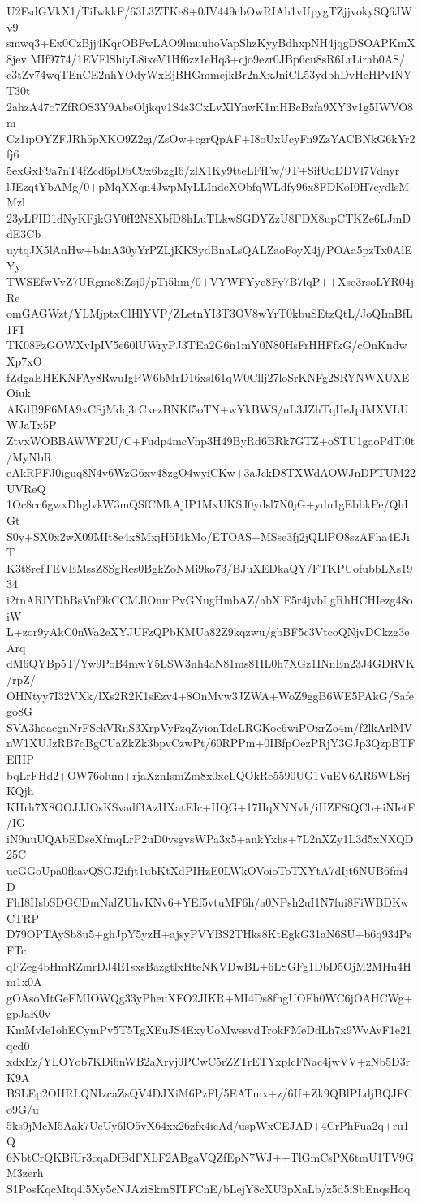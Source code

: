 U2FsdGVkX1/TiIwkkF/63L3ZTKe8+0JV449cbOwRIAh1vUpygTZjjvokySQ6JWv9
smwq3+Ex0CzBjj4KqrOBFwLAO9lmuuhoVapShzKyyBdhxpNH4jqgDSOAPKmX8jev
MIf9774/1EVFlShiyL8ixeV1Hf6zz1eHq3+cjo9ezr0JBp6cu8sR6LrLirab0AS/
c3tZv74wqTEnCE2nhYOdyWxEjBHGmmejkBr2nXxJniCL53ydbhDvHeHPvINYT30t
2ahzA47o7ZfROS3Y9AbsOljkqv1S4s3CxLvXlYnwK1mHBcBzfa9XY3v1g5IWVO8m
Cz1ipOYZFJRh5pXKO9Z2gi/ZsOw+cgrQpAF+I8oUxUcyFn9ZzYACBNkG6kYr2fj6
5exGxF9a7nT4fZcd6pDbC9x6bzgI6/zlX1Ky9tteLFfFw/9T+SifUoDDVl7Vdnyr
lJEzqtYbAMg/0+pMqXXqn4JwpMyLLIndeXObfqWLdfy96x8FDKoI0H7eydlsMMzl
23yLFID1dNyKFjkGY0fI2N8XbfD8hLuTLkwSGDYZzU8FDX8upCTKZe6LJmDdE3Cb
uytqJX5lAnHw+b4nA30yYrPZLjKKSydBnaLsQALZaoFoyX4j/POAa5pzTx0AlEYy
TWSEfwVvZ7URgmc8iZsj0/pTi5hm/0+VYWFYyc8Fy7B7lqP++Xse3rsoLYR04jRe
omGAGWzt/YLMjptxClHlYVP/ZLetnYI3T3OV8wYrT0kbuSEtzQtL/JoQImBfL1FI
TK08FzGOWXvIpIV5e60lUWryPJ3TEa2G6n1mY0N80HsFrHHFfkG/cOnKndwXp7xO
fZdgaEHEKNFAy8RwuIgPW6bMrD16xsI61qW0Cllj27loSrKNFg2SRYNWXUXEOiuk
AKdB9F6MA9xCSjMdq3rCxezBNKf5oTN+wYkBWS/uL3JZhTqHeJpIMXVLUWJaTx5P
ZtvxWOBBAWWF2U/C+Fudp4mcVnp3H49ByRd6BRk7GTZ+oSTU1gaoPdTi0t/MyNbR
eAkRPFJ0iguq8N4v6WzG6xv48zgO4wyiCKw+3aJckD8TXWdAOWJnDPTUM22UVReQ
1Oc8cc6gwxDhglvkW3mQSfCMkAjIP1MxUKSJ0ydsl7N0jG+ydn1gEbbkPe/QhIGt
S0y+SX0x2wX09MIt8e4x8MxjH5I4kMo/ETOAS+MSse3fj2jQLlPO8szAFha4EJiT
K3t8refTEVEMssZ8SgRes0BgkZoNMi9ko73/BJuXEDkaQY/FTKPUofubbLXs1934
i2tnARlYDbBsVnf9kCCMJlOnmPvGNugHmbAZ/abXlE5r4jvbLgRhHCHIezg48oiW
L+zor9yAkC0nWa2eXYJUFzQPbKMUa82Z9kqzwu/gbBF5c3VtcoQNjvDCkzg3eArq
dM6QYBp5T/Yw9PoB4mwY5LSW3nh4aN81ms81IL0h7XGz1INnEn23J4GDRVK/rpZ/
OHNtyy7I32VXk/lXs2R2K1sEzv4+8OnMvw3JZWA+WoZ9ggB6WE5PAkG/Safego8G
SVA3hoacgnNrFSckVRnS3XrpVyFzqZyionTdeLRGKoe6wiPOxrZo4m/f2lkArlMV
nW1XUJzRB7qBgCUaZkZk3bpvCzwPt/60RPPm+0IBfpOezPRjY3GJp3QzpBTFEfHP
bqLrFHd2+OW76olum+rjaXznIsmZm8x0xcLQOkRe5590UG1VuEV6AR6WLSrjKQjh
KHrh7X8OOJJJOsKSvadf3AzHXatEIc+HQG+17HqXNNvk/iHZF8iQCb+iNIetF/IG
iN9uuUQAbEDseXfmqLrP2uD0vsgvsWPa3x5+ankYxhs+7L2nXZy1L3d5xNXQD25C
ueGGoUpa0fkavQSGJ2ifjt1ubKtXdPIHzE0LWkOVoioToTXYtA7dIjt6NUB6fm4D
FhI8HsbSDGCDmNalZUhvKNv6+YEf5vtuMF6h/a0NPsh2uI1N7fui8FiWBDKwCTRP
D79OPTAySb8u5+ghJpY5yzH+ajsyPVYBS2THks8KtEgkG31aN6SU+b6q934PsFTc
qFZeg4bHmRZmrDJ4E1sxsBazgtlxHteNKVDwBL+6LSGFg1DbD5OjM2MHu4Hm1x0A
gOAsoMtGeEMIOWQg33yPheuXFO2JIKR+MI4Ds8fhgUOFh0WC6jOAHCWg+gpJaK0v
KmMvIe1ohECymPv5T5TgXEuJS4ExyUoMwssvdTrokFMeDdLh7x9WvAvF1e21qcd0
xdxEz/YLOYob7KDi6nWB2aXryj9PCwC5rZZTrETYxplcFNac4jwVV+zNb5D3rK9A
BSLEp2OHRLQNIzcaZsQV4DJXiM6PzFl/5EATmx+z/6U+Zk9QBlPLdjBQJFCo9G/u
5ks9jMcM5Aak7UeUy6lO5vX64xx26zfx4icAd/uspWxCEJAD+4CrPhFua2q+ru1Q
6NbtCrQKBfUr3cqaDfBdFXLF2ABgaVQZfEpN7WJ++TlGmCsPX6tmU1TV9GM3zerh
S1PosKqcMtq4l5Xy5cNJAziSkmSITFCnE/bLejY8cXU3pXaLb/z5d5iSbEnqsHoq
